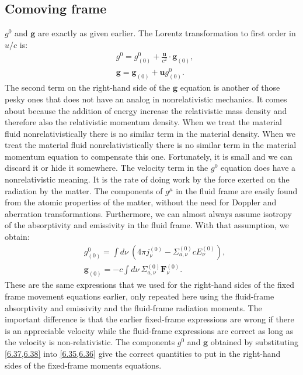 \documentclass[letterpaper]{report}
\newcommand\bs{\boldsymbol}
\renewcommand{\(}{\left(}
\renewcommand{\)}{\right)}
\renewcommand{\[}{\left[}
\renewcommand{\]}{\right]}
\begin{document}
\subsection{Comoving frame}
$g^0$ and $\bs{g}$ are exactly as given earlier. The Lorentz transformation to
first order in $u/c$ is:
\begin{align}
  &g^0 = g_{(0)}^0 + \frac{\bs{u}}{c^2}\cdot \bs{g}_{(0)}, \label{6.35}\\
  &\bs{g} = \bs{g}_{(0)} + \bs{u} g_{(0)}^0. \label{6.36}
\end{align}
The second term on the right-hand side of the $\bs{g}$ equation is another of
those pesky ones that does not have an analog in nonrelativistic mechanics. It
comes about because the addition of energy increase the relativistic mass
density and therefore also the relativistic momentum density. When we treat
the material fluid nonrelativistically there is no similar term in the
material density. When we treat the material fluid nonrelativistically there
is no similar term in the material momentum equation to compensate this one.
Fortunately, it is small and we can discard it or hide it somewhere. The
velocity term in the $g^0$ equation does have a nonrelativistic meaning. It is
the rate of doing work by the force exerted on the radiation by the matter.
The components of $g^{\mu}$ in the fluid frame are easily found from the
atomic properties of the matter, without the need for Doppler and aberration
transformations. Furthermore, we can almost always assume isotropy of the
absorptivity and emissivity in the fluid frame. With that assumption, we
obtain:
\begin{align}
  &g_{(0)}^0 = \int d\nu\ \(4\pi
  j_{\nu}^{(0)}-\Sigma_{a,\nu}^{(0)}cE_{\nu}^{(0)}\), \label{6.37}\\
  &\bs{g}_{(0)} = -c \int d\nu\ \Sigma_{a,\nu}^{(0)}\bs{F}_{\nu}^{(0)}.
  \label{6.38} 
\end{align}
These are the same expressions that we used for the right-hand sides of the
fixed frame movement equations earlier, only repeated here using the
fluid-frame absorptivity and emissivity and the fluid-frame radiation moments.
The important difference is that the earlier fixed-frame expressions are wrong
if there is an appreciable velocity while the fluid-frame expressions are
correct as long as the velocity is non-relativistic. The components $g^0$ and
$\bs{g}$ obtained by substituting \cref{6.37,6.38} into \cref{6.35,6.36} give
the correct quantities to put in the right-hand sides of the fixed-frame
moments equations.
\end{document}
